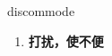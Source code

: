 
\begin{frame}
{\huge discommode}
\begin{center}
\begin{enumerate}\Large
  \item \textbf{打扰，使不便}
\end{enumerate}
\end{center}
\end{frame}
